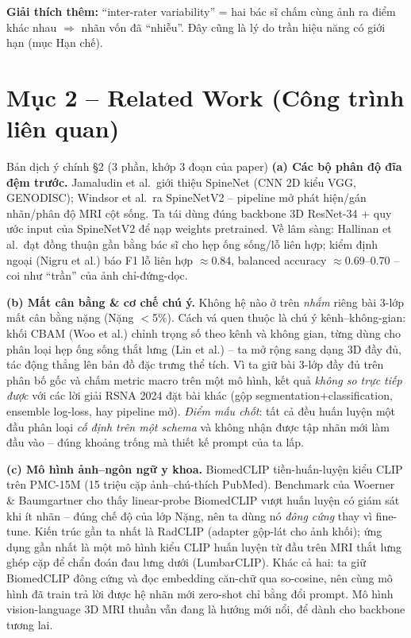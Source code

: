 \documentclass[12pt,a4paper]{article}
\begin{document}
\textbf{Giải thích thêm:} ``inter-rater variability'' = hai bác sĩ chấm cùng ảnh ra điểm khác nhau $\Rightarrow$ nhãn vốn đã ``nhiễu''. Đây cũng là lý do trần hiệu năng có giới hạn (mục Hạn chế).

\section{Mục 2 -- Related Work (Công trình liên quan)}

\begin{dichbox}{Bản dịch ý chính §2 (3 phần, khớp 3 đoạn của paper)}
\textbf{(a) Các bộ phân độ đĩa đệm trước.} Jamaludin et al.\ giới thiệu SpineNet (CNN 2D kiểu VGG, GENODISC); Windsor et al.\ ra SpineNetV2 -- pipeline mở phát hiện/gán nhãn/phân độ MRI cột sống. Ta tái dùng đúng backbone 3D ResNet-34 + quy ước input của SpineNetV2 để nạp weights pretrained. Về lâm sàng: Hallinan et al.\ đạt đồng thuận gần bằng bác sĩ cho hẹp ống sống/lỗ liên hợp; kiểm định ngoại (Nigru et al.) báo F1 lỗ liên hợp $\approx$0.84, balanced accuracy $\approx$0.69--0.70 -- coi như ``trần'' của ảnh chỉ-đứng-dọc.

\textbf{(b) Mất cân bằng \& cơ chế chú ý.} Không hệ nào ở trên \emph{nhắm} riêng bài 3-lớp mất cân bằng nặng (Nặng $<$5\%). Cách vá quen thuộc là chú ý kênh--không-gian: khối CBAM (Woo et al.) chỉnh trọng số theo kênh và không gian, từng dùng cho phân loại hẹp ống sống thắt lưng (Lin et al.) -- ta mở rộng sang dạng 3D đầy đủ, tác động thẳng lên bản đồ đặc trưng thể tích. Vì ta giữ bài 3-lớp đầy đủ trên phân bố gốc và chấm metric macro trên một mô hình, kết quả \emph{không so trực tiếp được} với các lời giải RSNA 2024 đặt bài khác (gộp segmentation+classification, ensemble log-loss, hay pipeline mở). \emph{Điểm mấu chốt}: tất cả đều huấn luyện một đầu phân loại \emph{cố định trên một schema} và không nhận được tập nhãn mới làm đầu vào -- đúng khoảng trống mà thiết kế prompt của ta lấp.

\textbf{(c) Mô hình ảnh--ngôn ngữ y khoa.} BiomedCLIP tiền-huấn-luyện kiểu CLIP trên PMC-15M (15 triệu cặp ảnh--chú-thích PubMed). Benchmark của Woerner \& Baumgartner cho thấy linear-probe BiomedCLIP vượt huấn luyện có giám sát khi ít nhãn -- đúng chế độ của lớp Nặng, nên ta dùng nó \emph{đông cứng} thay vì fine-tune. Kiến trúc gần ta nhất là RadCLIP (adapter gộp-lát cho ảnh khối); ứng dụng gần nhất là một mô hình kiểu CLIP huấn luyện từ đầu trên MRI thắt lưng ghép cặp để chẩn đoán đau lưng dưới (LumbarCLIP). Khác cả hai: ta giữ BiomedCLIP đông cứng và đọc embedding căn-chữ qua so-cosine, nên cùng mô hình đã train trả lời được hệ nhãn mới zero-shot chỉ bằng đổi prompt. Mô hình vision-language 3D MRI thuần vẫn đang là hướng mới nổi, để dành cho backbone tương lai.
\end{dichbox}
\end{document}
